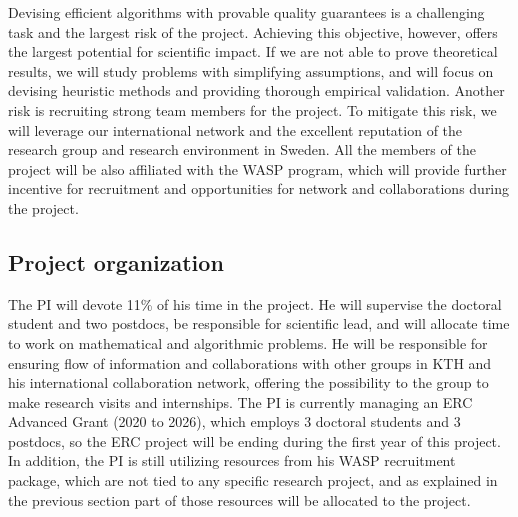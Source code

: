 \documentclass[a4paper,11pt]{article}
\begin{document}
Devising efficient algorithms with provable quality guarantees is a challenging task
and the largest risk of the project. 
Achieving this objective, however, offers the largest potential for scientific impact.
If we are not able to prove theoretical results, 
we will study problems with simplifying assumptions, and 
will focus on devising heuristic methods and providing thorough empirical validation.
Another risk is recruiting strong team members for the project. 
To mitigate this risk, we will leverage our international network
and the excellent reputation of the research group and research environment in Sweden. 
All the members of the project will be also affiliated with the WASP program, 
which will provide further incentive for recruitment and opportunities 
for network and collaborations during the project.


\subsection{Project organization}


The PI will devote 11\% of his time in the project. 
He will supervise the doctoral student and two postdocs, 
be responsible for scientific lead, 
and will allocate time to work on mathematical and algorithmic problems.
He will be responsible for ensuring flow of information and collaborations
with other groups in KTH and his international collaboration network, 
offering the possibility to the group to make research visits and internships.
The PI is currently managing an ERC Advanced Grant (2020 to 2026),
which employs 3 doctoral students and 3 postdocs, 
so the ERC project will be ending during the first year of this project. 
In addition, the PI is still utilizing resources from his WASP recruitment package, 
which are not tied to any specific research project, 
and as explained in the previous section part of those resources will be allocated to the {\acronym} project.
\end{document}
